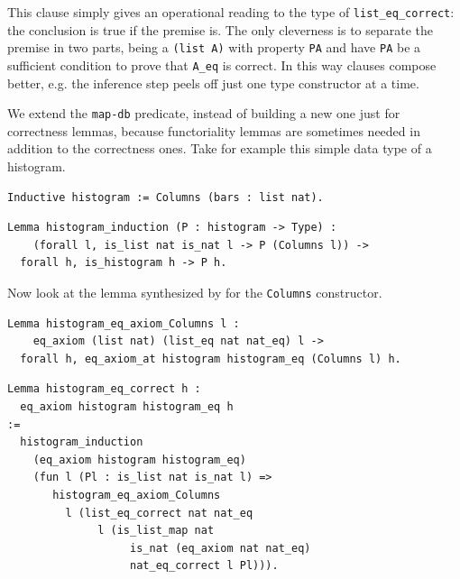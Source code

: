 \documentclass[sigplan,10pt,review]{acmart}\settopmatter{printfolios=true,printccs=false,printacmref=false}
\newcommand{\derive}[1]{\keys{#1}}
\begin{document}
\noindent
This clause simply gives an operational reading to the type
of \lstinline+list_eq_correct+: the conclusion is true if the premise
is. The only cleverness is to separate the premise in two parts,
being a \lstinline+(list A)+ with property \lstinline+PA+ and have
\lstinline+PA+ be a sufficient condition to prove that \lstinline+A_eq+
is correct. In this way clauses compose better, e.g. the
inference step peels off just one type constructor at a time.

We extend the \lstinline+map-db+ predicate, instead of building
a new one just for correctness lemmas, because functoriality lemmas
are sometimes needed in addition to the correctness ones.
Take for example this simple data type of a histogram.

\begin{minipage}{\textwidth}\begin{lstlisting}
Inductive histogram := Columns (bars : list nat).
\end{lstlisting}\end{minipage}

\begin{minipage}{\textwidth}\begin{lstlisting}
Lemma histogram_induction (P : histogram -> Type) :
    (forall l, is_list nat is_nat l -> P (Columns l)) ->
  forall h, is_histogram h -> P h.
\end{lstlisting}\end{minipage}

Now look at the lemma synthesized by \derive{eqK}
for the \lstinline+Columns+ constructor.

\begin{minipage}{\textwidth}\begin{lstlisting}
Lemma histogram_eq_axiom_Columns l :
    eq_axiom (list nat) (list_eq nat nat_eq) l ->
  forall h, eq_axiom_at histogram histogram_eq (Columns l) h.
\end{lstlisting}\end{minipage}

\begin{minipage}{\textwidth}\begin{lstlisting}
Lemma histogram_eq_correct h :
  eq_axiom histogram histogram_eq h
:=
  histogram_induction 
    (eq_axiom histogram histogram_eq)
    (fun l (Pl : is_list nat is_nat l) =>
       histogram_eq_axiom_Columns
         l (list_eq_correct nat nat_eq
              l (is_list_map nat
                   is_nat (eq_axiom nat nat_eq)
                   nat_eq_correct l Pl))).
\end{lstlisting}\end{minipage}
\end{document}

